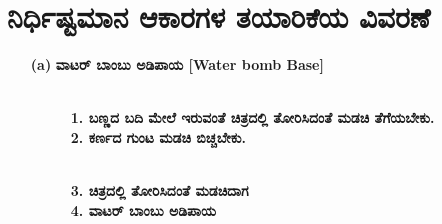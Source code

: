 \section{ನಿರ್ಧಿಷ್ಟಮಾನ ಆಕಾರಗಳ ತಯಾರಿಕೆಯ ವಿವರಣೆ}\label{sec2.2}%
\begin{enumerate}
\item[{\bf (a)}] \textbf{ವಾಟರ್ ಬಾಂಬು ಅಡಿಪಾಯ  [Water bomb Base]}
\begin{figure}[H]
\end{figure}
\begin{figure}[H]
\\
\textbf{1. ಬಣ್ಣದ ಬದಿ ಮೇಲೆ ಇರುವಂತೆ ಚಿತ್ರದಲ್ಲಿ ತೋರಿಸಿದಂತೆ ಮಡಚಿ ತೆಗೆಯಬೇಕು.}\\
\textbf{2. ಕರ್ಣದ ಗುಂಟ ಮಡಚಿ ಬಿಚ್ಚಬೇಕು.}
\end{figure}
\begin{figure}[H]
\\
\textbf{3. ಚಿತ್ರದಲ್ಲಿ ತೋರಿಸಿದಂತೆ ಮಡಚಿದಾಗ}\\
\textbf{4. ವಾಟರ್ ಬಾಂಬು ಅಡಿಪಾಯ}
\end{figure}



\end{enumerate}
